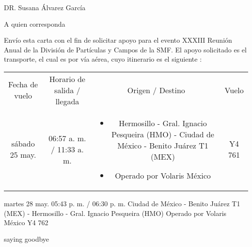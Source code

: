 \documentclass[12pt,a4paper]{letter}
\begin{document}
 
	\begin{letter}{DR. Susana \'Alvarez Garc\'ia } 
		\opening{A quien corresponda} 
		
Env\'io esta carta con el fin de solicitar apoyo para el evento XXXIII Reuni\'on Anual de la Divisi\'on de Part\'iculas y Campos de la SMF.
El apoyo solicitado es el transporte, el cual es por v\'ia a\'erea, cuyo itinerario es el siguiente :
\small{
\begin{tabular}{cccc}
Fecha de vuelo &	Horario de salida / llegada &	Origen / Destino &	Vuelo \\
s\'abado 25 may. &	06:57 a. m. / 11:33 a. m. &	 {\begin{itemize}\item Hermosillo - Gral. Ignacio Pesqueira (HMO) - Ciudad de M\'exico - Benito Ju\'arez T1 (MEX)
\item  Operado por Volaris M\'exico
\end{itemize}}
 &	Y4
761 \\
\end{tabular}
}

martes 28 may. 	05:43 p. m. / 06:30 p. m. 	Ciudad de M\'exico - Benito Ju\'arez T1 (MEX) - Hermosillo - Gral. Ignacio Pesqueira (HMO)
Operado por Volaris M\'exico 	Y4
762
		
		\closing{saying goodbye} 
	\end{letter} 
\end{document}
